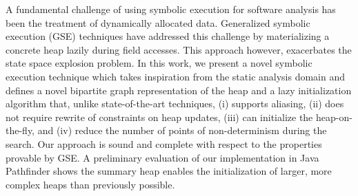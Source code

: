 A fundamental challenge of using symbolic execution for software
analysis has been the treatment of dynamically allocated
data. Generalized symbolic execution (GSE) techniques have addressed
this challenge by materializing a concrete heap lazily during field
accesses.  This approach however, exacerbates the state space
explosion problem.  In this work, we present a novel symbolic
execution technique which takes inspiration from the static analysis
domain and defines a novel bipartite graph representation of the heap
and a lazy initialization algorithm that, unlike state-of-the-art
techniques, (i) supports aliasing, (ii) does not require rewrite of
constraints on heap updates, (iii) can initialize the heap-on-the-fly,
and (iv) reduce the number of points of non-determinism during the
search. Our approach is sound and complete with respect to the
properties provable by GSE. A preliminary evaluation of our
implementation in Java Pathfinder shows the summary heap enables the
initialization of larger, more complex heaps than previously possible.

\begin{comment}
A fundamental challenge of using symbolic execution for software
analysis has been the treatment of dynamically allocated data.
State-of-the-art techniques have addressed this challenge through
either (a) the use of summaries that over-approximate possible heaps, or
(b) by materializing a concrete heap lazily during generalized
symbolic execution. In this work, we present a novel heap
initialization and analysis technique which takes inspiration from
both approaches and constructs precise heap summaries lazily during
symbolic execution.  Our approach is 1) \emph{scalable}: it reduces the
points of non-determinism compared to generalized symbolic execution
and explores each control-flow path only once for any given set of
isomorphic heaps, 2) \emph{precise}: at any given point during symbolic
execution, the symbolic heap represents the exact set of feasible
concrete heap structures for the program under analysis, and 3)
\emph{expressive}: the symbolic heap can represent recursive data
structures. We demonstrate the precision and scalability of our
approach by implementing it as an extension to the Symbolic PathFinder
framework for analyzing Java programs.
\end{comment}


